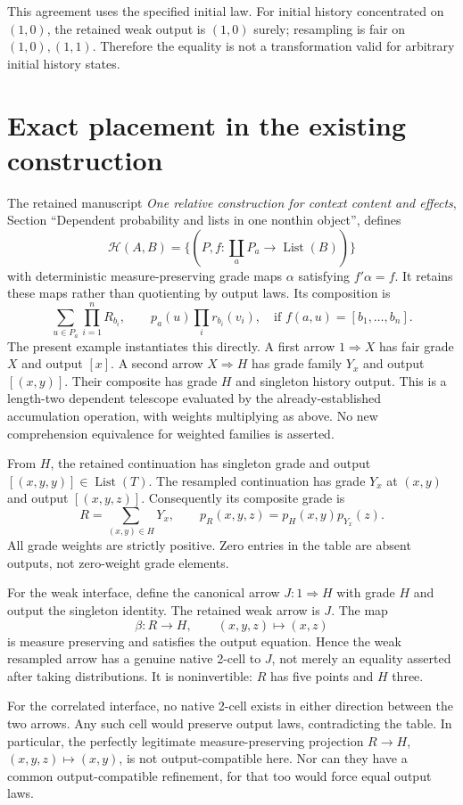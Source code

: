 \documentclass[11pt]{article}
\begin{document}
This agreement uses the specified initial law. For initial history concentrated on $(1,0)$, the retained weak output is $(1,0)$ surely; resampling is fair on $(1,0),(1,1)$. Therefore the equality is not a transformation valid for arbitrary initial history states.

\section{Exact placement in the existing construction}
The retained manuscript \emph{One relative construction for context content and effects}, Section ``Dependent probability and lists in one nonthin object'', defines
\[
\mathcal H(A,B)=\{(P,f:\coprod_aP_a\to\operatorname{List}(B))\}
\]
with deterministic measure-preserving grade maps $\alpha$ satisfying $f'\alpha=f$. It retains these maps rather than quotienting by output laws. Its composition is
\[
\sum_{u\in P_a}\prod_{i=1}^nR_{b_i},\qquad
p_a(u)\prod_i r_{b_i}(v_i),
\quad\text{if }f(a,u)=[b_1,\ldots,b_n].
\]
The present example instantiates this directly. A first arrow $1\Rightarrow X$ has fair grade $X$ and output $[x]$. A second arrow $X\Rightarrow H$ has grade family $Y_x$ and output $[(x,y)]$. Their composite has grade $H$ and singleton history output. This is a length-two dependent telescope evaluated by the already-established accumulation operation, with weights multiplying as above. No new comprehension equivalence for weighted families is asserted.

From $H$, the retained continuation has singleton grade and output $[(x,y,y)]\in\operatorname{List}(T)$. The resampled continuation has grade $Y_x$ at $(x,y)$ and output $[(x,y,z)]$. Consequently its composite grade is
\[
 R=\sum_{(x,y)\in H}Y_x,\qquad p_R(x,y,z)=p_H(x,y)p_{Y_x}(z).
\]
All grade weights are strictly positive. Zero entries in the table are absent outputs, not zero-weight grade elements.

For the weak interface, define the canonical arrow $J:1\Rightarrow H$ with grade $H$ and output the singleton identity. The retained weak arrow is $J$. The map
\[
 \beta:R\longrightarrow H,\qquad (x,y,z)\longmapsto(x,z)
\]
is measure preserving and satisfies the output equation. Hence the weak resampled arrow has a genuine native 2-cell to $J$, not merely an equality asserted after taking distributions. It is noninvertible: $R$ has five points and $H$ three.

For the correlated interface, no native 2-cell exists in either direction between the two arrows. Any such cell would preserve output laws, contradicting the table. In particular, the perfectly legitimate measure-preserving projection $R\to H$, $(x,y,z)\mapsto(x,y)$, is not output-compatible here. Nor can they have a common output-compatible refinement, for that too would force equal output laws.
\end{document}

